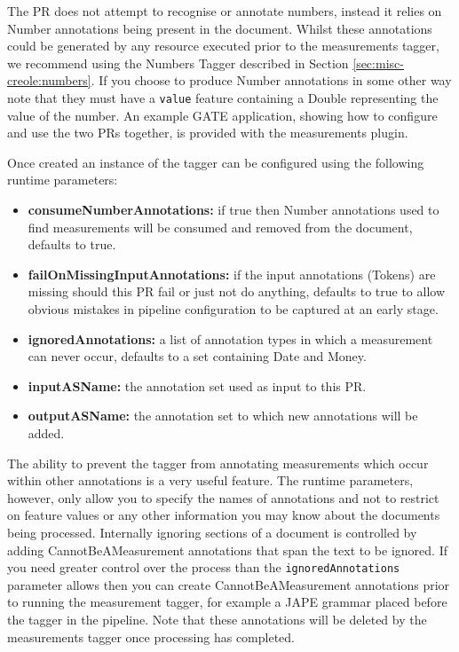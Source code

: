 The PR does not attempt to recognise or annotate numbers, instead it relies on
Number annotations being present in the document. Whilst these annotations could
be generated by any resource executed prior to the measurements tagger, we
recommend using the Numbers Tagger described in Section
\ref{sec:misc-creole:numbers}. If you choose to produce Number annotations in
some other way note that they must have a \texttt{value} feature containing a
Double representing the value of the number. An example GATE application,
showing how to configure and use the two PRs together, is provided with the
measurements plugin.

Once created an instance of the tagger can be configured using the following
runtime parameters:

\begin{itemize}
\item \textbf{consumeNumberAnnotations:} if true then Number annotations used to
  find measurements will be consumed and removed from the document, defaults to
  true.
\item \textbf{failOnMissingInputAnnotations:} if the input annotations (Tokens)
  are missing should this PR fail or just not do anything, defaults to true to
  allow obvious mistakes in pipeline configuration to be captured at an early
  stage. 
\item \textbf{ignoredAnnotations:} a list of annotation types in which a
  measurement can never occur, defaults to a set containing Date and Money.
\item \textbf{inputASName:} the annotation set used as input to this PR.
\item \textbf{outputASName:} the annotation set to which new annotations will
  be added.
\end{itemize}

The ability to prevent the tagger from annotating measurements which occur
within other annotations is a very useful feature. The runtime parameters,
however, only allow you to specify the names of annotations and not to restrict
on feature values or any other information you may know about the documents
being processed.
Internally ignoring sections of a document is controlled by adding
CannotBeAMeasurement annotations that span the text to be ignored. If you need
greater control over the process than the \texttt{ignoredAnnotations} parameter
allows then you can create CannotBeAMeasurement annotations prior to running the
measurement tagger, for example a JAPE grammar placed before the tagger in the
pipeline. Note that these annotations will be deleted by the measurements tagger
once processing has completed.

